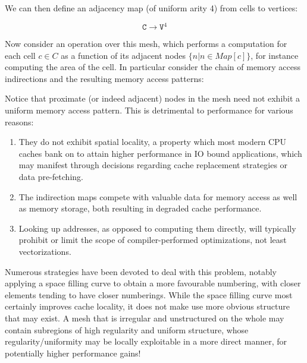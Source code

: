 We can then define an adjacency map (of uniform arity 4) from cells to vertices:

$$\texttt{C} \rightarrow \texttt{V}^4$$

Now consider an operation over this mesh, which performs a computation for each cell $c \in C$ as a function of its adjacent nodes $\{n | n \in Map[c]\}$, for instance computing the area of the cell. In particular consider the chain of memory access indirections and the resulting memory access patterns:

%

Notice that proximate (or indeed adjacent) nodes in the mesh need not exhibit a uniform memory access pattern. This is detrimental to performance for various reasons:
\begin{enumerate}
\item They do not exhibit spatial locality, a property which most modern CPU caches bank on to attain higher performance in IO bound applications, which may manifest through decisions regarding cache replacement strategies or data pre-fetching.
\item The indirection maps compete with valuable data for memory access as well as memory storage, both resulting in degraded cache performance.
\item Looking up addresses, as opposed to computing them directly, will typically prohibit or limit the scope of compiler-performed optimizations, not least vectorizations.
\end{enumerate}

Numerous strategies have been devoted to deal with this problem, notably applying a space filling curve to obtain a more favourable numbering, with closer elements tending to have closer numberings. While the space filling curve most certainly improves cache locality, it does not make use more obvious structure that may exist. A mesh that is irregular and unstructured on the whole may contain subregions of high regularity and uniform structure, whose regularity/uniformity may be locally exploitable in a more direct manner, for potentially higher performance gains!


